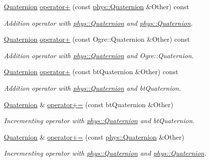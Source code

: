 \begin{DoxyCompactItemize}
\hyperlink{classphys_1_1Quaternion}{Quaternion} \hyperlink{classphys_1_1Quaternion_af3f9a9b5835400dc5b83ba06bf9845b0}{operator+} (const \hyperlink{classphys_1_1Quaternion}{phys::Quaternion} \&Other) const 
\begin{DoxyCompactList}\small\item\em Addition operator with \hyperlink{classphys_1_1Quaternion}{phys::Quaternion} and \hyperlink{classphys_1_1Quaternion}{phys::Quaternion}. \item\end{DoxyCompactList}\item 
\hyperlink{classphys_1_1Quaternion}{Quaternion} \hyperlink{classphys_1_1Quaternion_a71fcb37dae7602349e856b202ca00e89}{operator+} (const Ogre::Quaternion \&Other) const 
\begin{DoxyCompactList}\small\item\em Addition operator with \hyperlink{classphys_1_1Quaternion}{phys::Quaternion} and Ogre::Quaternion. \item\end{DoxyCompactList}\item 
\hyperlink{classphys_1_1Quaternion}{Quaternion} \hyperlink{classphys_1_1Quaternion_a3dc35eeb41c43ce79fdf2fc64fc15532}{operator+} (const btQuaternion \&Other) const 
\begin{DoxyCompactList}\small\item\em Addition operator with \hyperlink{classphys_1_1Quaternion}{phys::Quaternion} and btQuaternion. \item\end{DoxyCompactList}\item 
\hyperlink{classphys_1_1Quaternion}{Quaternion} \& \hyperlink{classphys_1_1Quaternion_ab167530770fb0463c5473b5f533db9a8}{operator+=} (const btQuaternion \&Other)
\begin{DoxyCompactList}\small\item\em Incrementing operator with \hyperlink{classphys_1_1Quaternion}{phys::Quaternion} and btQuaternion. \item\end{DoxyCompactList}\item 
\hyperlink{classphys_1_1Quaternion}{Quaternion} \& \hyperlink{classphys_1_1Quaternion_a5d9d2ee516e4e142417b21eecf2e94ce}{operator+=} (const \hyperlink{classphys_1_1Quaternion}{phys::Quaternion} \&Other)
\begin{DoxyCompactList}\small\item\em Incrementing operator with \hyperlink{classphys_1_1Quaternion}{phys::Quaternion} and \hyperlink{classphys_1_1Quaternion}{phys::Quaternion}. \item\end{DoxyCompactList}\item 

\end{DoxyCompactItemize}
